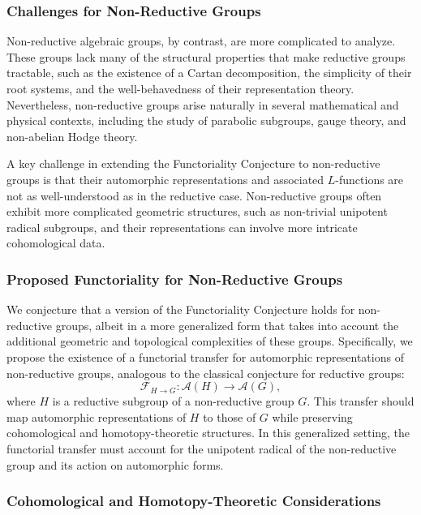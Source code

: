 \documentclass{article}
\theoremstyle{remark}
\begin{document}
\subsubsection{Challenges for Non-Reductive Groups}

Non-reductive algebraic groups, by contrast, are more complicated to analyze. These groups lack many of the structural properties that make reductive groups tractable, such as the existence of a Cartan decomposition, the simplicity of their root systems, and the well-behavedness of their representation theory. Nevertheless, non-reductive groups arise naturally in several mathematical and physical contexts, including the study of parabolic subgroups, gauge theory, and non-abelian Hodge theory.

A key challenge in extending the Functoriality Conjecture to non-reductive groups is that their automorphic representations and associated $L$-functions are not as well-understood as in the reductive case. Non-reductive groups often exhibit more complicated geometric structures, such as non-trivial unipotent radical subgroups, and their representations can involve more intricate cohomological data.

\subsubsection{Proposed Functoriality for Non-Reductive Groups}

We conjecture that a version of the Functoriality Conjecture holds for non-reductive groups, albeit in a more generalized form that takes into account the additional geometric and topological complexities of these groups. Specifically, we propose the existence of a functorial transfer for automorphic representations of non-reductive groups, analogous to the classical conjecture for reductive groups:
\[
\mathcal{F}_{H \to G}: \mathcal{A}(H) \to \mathcal{A}(G),
\]
where $H$ is a reductive subgroup of a non-reductive group $G$. This transfer should map automorphic representations of $H$ to those of $G$ while preserving cohomological and homotopy-theoretic structures. In this generalized setting, the functorial transfer must account for the unipotent radical of the non-reductive group and its action on automorphic forms.

\subsubsection{Cohomological and Homotopy-Theoretic Considerations}
\end{document}
